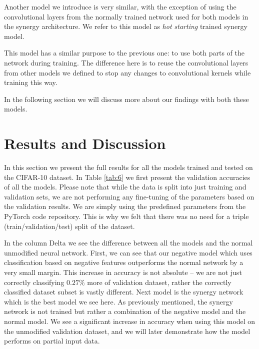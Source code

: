 \documentclass[b5paper]{book}
\begin{document}
Another model we introduce is very similar, with the exception of using the convolutional layers from the normally trained network used for both models in the synergy architecture. We refer to this model as \emph{hot starting} trained synergy model. 

This model has a similar purpose to the previous one: to use both parts of the network during training. The difference here is to reuse the convolutional layers from other models we defined to stop any changes to convolutional kernels while training this way.

In the following section we will discuss more about our findings with both these models.

\section{Results and Discussion}
\label{results}

In this section we present the full results for all the models trained and tested on the CIFAR-10 dataset. In Table \ref{tab:6} we first present the validation accuracies of all the models. Please note that while the data is split into just training and validation sets, we are not performing any fine-tuning of the parameters based on the validation results. We are simply using the predefined parameters from the PyTorch code repository. This is why we felt that there was no need for a triple (train/validation/test) split of the dataset.

In the column Delta we see the difference between all the models and the normal unmodified neural network. First, we can see that our negative model which uses classification based on negative features outperforms the normal network by a very small margin. This increase in accuracy is not absolute -- we are not just correctly classifying \(0.27\%\) more of validation dataset, rather the correctly classified dataset subset is vastly different. Next model is the synergy network which is the best model we see here. As previously mentioned, the synergy network is not trained but rather a combination of the negative model and the normal model. We see a significant increase in accuracy when using this model on the unmodified validation dataset, and we will later demonstrate how the model performs on partial input data.
\end{document}
